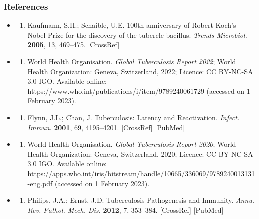 \documentclass{article}
\begin{document}
\subsubsection{\textbf{References}}
\begin{itemize}
\item \begin{enumerate}
\item 
Kaufmann, S.H.; Schaible, U.E. 100th anniversary of Robert Koch's Nobel Prize for the discovery of the tubercle bacillus. \textit{Trends Microbiol.} \textbf{2005}, 13, 469–475. [CrossRef]

\end{enumerate}

\item \begin{enumerate}
\item 
World Health Organisation. \textit{Global Tuberculosis Report 2022}; World Health Organization: Geneva, Switzerland, 2022; Licence: CC BY-NC-SA 3.0 IGO. Available online: https://www.who.int/publications/i/item/9789240061729 (accessed on 1 February 2023).

\end{enumerate}

\item \begin{enumerate}
\item 
Flynn, J.L.; Chan, J. Tuberculosis: Latency and Reactivation. \textit{Infect. Immun.} \textbf{2001}, 69, 4195–4201. [CrossRef] [PubMed]

\end{enumerate}

\item \begin{enumerate}
\item 
World Health Organisation. \textit{Global Tuberculosis Report 2020}; World Health Organization: Geneva, Switzerland, 2020; Licence: CC BY-NC-SA 3.0 IGO. Available online: https://apps.who.int/iris/bitstream/handle/10665/336069/9789240013131-eng.pdf (accessed on 1 February 2023).

\end{enumerate}

\item \begin{enumerate}
\item 
Philips, J.A.; Ernst, J.D. Tuberculosis Pathogenesis and Immunity. \textit{Annu. Rev. Pathol. Mech. Dis.} \textbf{2012}, 7, 353–384. [CrossRef] [PubMed]


\end{enumerate}
\end{itemize}
\end{document}
